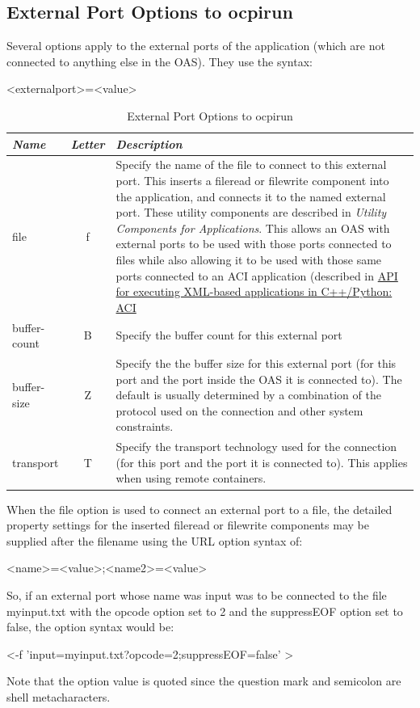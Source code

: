 \documentclass[10pt, a4paper, oneside]{article}
\renewcommand*{\arraystretch}{2.5}%
\renewcommand\_{\textunderscore\allowbreak} %
\begin{document}
{\subsection{External Port Options to ocpirun}\label{subsec:External port options to ocpirun}
Several options apply to the external ports of the application (which are not connected to anything else in the OAS). They use the syntax: \begin{ocpixml}
<externalport>=<value>\end{ocpixml}
\begin{table}[h!]
\caption{External Port Options to ocpirun}\label{External Port Options to ocpirun}
\renewcommand*{\arraystretch}{2.5}
\begin{tabular}[c]{| l | c | p{12cm}|}
\hline \emph{Name} &\emph{Letter} & \emph{Description}\\
\hline
file & f & Specify the name of the file to connect to this external port.  This inserts a file\_read or file\_write component into the application, and connects it to the named external port. These utility components are described in \emph{Utility Components for Applications}.  This allows an OAS with external ports to be used with those ports connected to files while also allowing it to be used with those same ports connected to an ACI application (described in \hyperlink{API for executing XML-based applications in C++/Python:  ACI} {API for executing XML-based applications in C++/Python:  ACI} \\ 
\hline  
buffer-count & B & Specify the buffer count for this external port\\ 
\hline   
buffer-size	& Z	& Specify the the buffer size for this external port (for this port and the port inside the OAS it is connected to).  The default is usually determined by a combination of the protocol used on the connection and other system constraints.\\ 
\hline  
transport &T& Specify the transport technology used for the connection (for this port and the port it is connected to).  This applies when using remote containers.\\ 
\hline
\end{tabular}
\end{table}
\newpage
When the file option is used to connect an external port to a file, the detailed property settings for the inserted file\_read or file\_write components may be supplied after the filename using the URL option syntax of:\begin{ocpixml}
<name>=<value>;<name2>=<value> \end{ocpixml}
So, if an external port whose name was input was to be connected to the file myinput.txt with the opcode option set to 2 and the suppressEOF option set to false, the option syntax would be:\begin{ocpixml}
<-f 'input=myinput.txt?opcode=2;suppressEOF=false' >\end{ocpixml}
Note that the option value is quoted since the question mark and semicolon are shell metacharacters.
}
\end{document}
